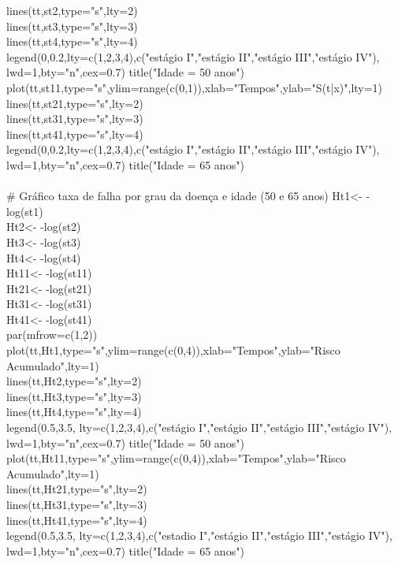 \documentclass[12pt,a4paper]{article}
\begin{document}
 	lines(tt,st2,type="s",lty=2)\\
 	lines(tt,st3,type="s",lty=3)\\
 	lines(tt,st4,type="s",lty=4)\\
 	legend(0,0.2,lty=c(1,2,3,4),c("estágio I","estágio II","estágio III","estágio IV"),
 	lwd=1,bty="n",cex=0.7)
 	title("Idade = 50 anos")\\
 	plot(tt,st11,type="s",ylim=range(c(0,1)),xlab="Tempos",ylab="S(t|x)",lty=1)\\
 	lines(tt,st21,type="s",lty=2)\\
 	lines(tt,st31,type="s",lty=3)\\
 	lines(tt,st41,type="s",lty=4)\\
 	legend(0,0.2,lty=c(1,2,3,4),c("estágio I","estágio II","estágio III","estágio IV"),
 	lwd=1,bty="n",cex=0.7)
 	title("Idade = 65 anos")\\
 	\vspace{0.25cm}\\
 	\# Gráfico taxa de falha por grau da doença e idade (50 e 65 anos)
 	Ht1<- -log(st1)\\
 	Ht2<- -log(st2)\\
 	Ht3<- -log(st3)\\
 	Ht4<- -log(st4)\\
 	Ht11<- -log(st11)\\
 	Ht21<- -log(st21)\\
 	Ht31<- -log(st31)\\
 	Ht41<- -log(st41)\\
 	par(mfrow=c(1,2))\\
 	plot(tt,Ht1,type="s",ylim=range(c(0,4)),xlab="Tempos",ylab="Risco Acumulado",lty=1)\\
 	lines(tt,Ht2,type="s",lty=2)\\
 	lines(tt,Ht3,type="s",lty=3)\\
 	lines(tt,Ht4,type="s",lty=4)\\
 	legend(0.5,3.5, lty=c(1,2,3,4),c("estágio I","estágio II","estágio III","estágio IV"),
 	lwd=1,bty="n",cex=0.7)
 	title("Idade = 50 anos")\\
 	plot(tt,Ht11,type="s",ylim=range(c(0,4)),xlab="Tempos",ylab="Risco Acumulado",lty=1)\\
 	lines(tt,Ht21,type="s",lty=2)\\
 	lines(tt,Ht31,type="s",lty=3)\\
 	lines(tt,Ht41,type="s",lty=4)\\
 	legend(0.5,3.5, lty=c(1,2,3,4),c("estadio I","estágio II","estágio III","estágio IV"),
 	lwd=1,bty="n",cex=0.7)
 	title("Idade = 65 anos")\\
\end{document}
